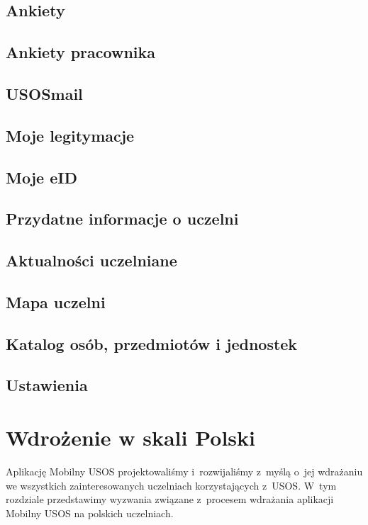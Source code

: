 \documentclass{pracamgr}
\begin{document}
\section{Ankiety}

\section{Ankiety pracownika}

\section{USOSmail}

\section{Moje legitymacje}

\section{Moje eID}

\section{Przydatne informacje o uczelni}

\section{Aktualności uczelniane}

\section{Mapa uczelni}

\section{Katalog osób, przedmiotów i jednostek}

\section{Ustawienia}

\chapter{Wdrożenie w skali Polski}

Aplikację Mobilny USOS projektowaliśmy i~rozwijaliśmy z~myślą o~jej wdrażaniu we wszystkich zainteresowanych uczelniach
korzystających z~USOS. W~tym rozdziale przedstawimy wyzwania związane z~procesem wdrażania aplikacji Mobilny USOS na
polskich uczelniach.
\end{document}
